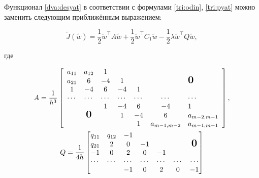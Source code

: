 Функционал \eqref{dva:desyat} в соответствии с формулами \eqref{tri:odin}, \eqref{tri:pyat} можно заменить следующим приближённым выражением:

\begin{equation}\label{tri:shest}

\tilde{J}(\tilde{w})=\frac12\tilde{w}^\top A\tilde{w}+\frac12\tilde{w}^\top C_1\tilde{w}-\frac12\lambda\tilde{w}^\top Q\tilde{w},

\end{equation}

где 

\begin{gather*}

A=\frac{1}{h^3}

\left[\begin{array}{ccccccl}a_{11} & a_{12} & 1 &  &  &  &  \\

a_{21} & 6 & -4 & 1 &  &  & \textbf{\Large 0} \\

1 & -4 & 6 & -4 & 1 &  & \\

\cdots  & \cdots & \cdots & \cdots& \cdots & \cdots & \cdots \\

 &  & 1 & -4 & 6 & -4 & 1 \\

 & \textbf{\Large 0} &  & 1 & -4 & 6 & a_{m-2,m-1} \\

 &  &  &  & 1 & a_{m-1,m-2} & a_{m-1,m-1} 

\end{array}\right], 

\\

\label{tri:shest:shtrih:dva}

Q=\frac{1}{4h}

\begin{bmatrix}

q_{11} & q_{12} & -1 &  &  &  &  \\

q_{21} & 2 & 0 & -1 &  &  & \textbf{\Large 0} \\

-1 & 0 & 2 & 0 & -1 &  & \\

\cdots  & \cdots & \cdots & \cdots& \cdots & \cdots & \cdots \\

 &  & -1 & 0 & 2 & 0 & -1 \\


\end{bmatrix}
\end{gather*}
